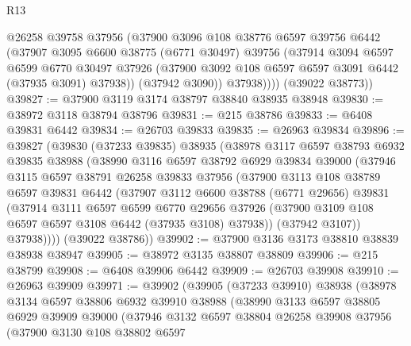 \begin{lexlean}{R13}
\begin{coremodule}
            @26258
            @39758
            @37956
            (@37900
              @3096
              @108
              @38776
              @6597
              @39756
              @6442
              (@37907
                @3095
                @6600
                @38775
                (@6771 @30497)
                @39756
                (@37914
                  @3094
                  @6597
                  @6599
                  @6770
                  @30497
                  @37926
                  (@37900 @3092 @108 @6597 @6597 @3091 @6442 (@37935 @3091) @37938))
                (@37942 @3090))
              @37938))))
      (@39022 @38773))
@39827 := @37900 @3119 @3174 @38797 @38840 @38935 @38948
@39830 := @38972 @3118 @38794 @38796
@39831 := @215 @38786
@39833 := @6408 @39831 @6442
@39834 := @26703 @39833
@39835 := @26963 @39834
@39896 := @39827
    (@39830
      (@37233 @39835)
      @38935
      (@38978
        @3117
        @6597
        @38793
        @6932
        @39835
        @38988
        (@38990
          @3116
          @6597
          @38792
          @6929
          @39834
          @39000
          (@37946
            @3115
            @6597
            @38791
            @26258
            @39833
            @37956
            (@37900
              @3113
              @108
              @38789
              @6597
              @39831
              @6442
              (@37907
                @3112
                @6600
                @38788
                (@6771 @29656)
                @39831
                (@37914
                  @3111
                  @6597
                  @6599
                  @6770
                  @29656
                  @37926
                  (@37900 @3109 @108 @6597 @6597 @3108 @6442 (@37935 @3108) @37938))
                (@37942 @3107))
              @37938))))
      (@39022 @38786))
@39902 := @37900 @3136 @3173 @38810 @38839 @38938 @38947
@39905 := @38972 @3135 @38807 @38809
@39906 := @215 @38799
@39908 := @6408 @39906 @6442
@39909 := @26703 @39908
@39910 := @26963 @39909
@39971 := @39902
    (@39905
      (@37233 @39910)
      @38938
      (@38978
        @3134
        @6597
        @38806
        @6932
        @39910
        @38988
        (@38990
          @3133
          @6597
          @38805
          @6929
          @39909
          @39000
          (@37946
            @3132
            @6597
            @38804
            @26258
            @39908
            @37956
            (@37900
              @3130
              @108
              @38802
              @6597

\end{coremodule}
\end{lexlean}
